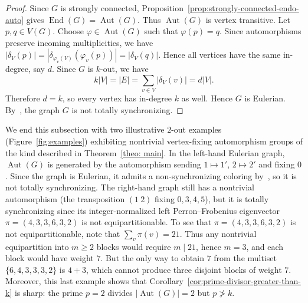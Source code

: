\documentclass[a4paper,10pt]{amsart}
\theoremstyle{plain}
\theoremstyle{definition}
\DeclareMathOperator{\Aut}{Aut}
\DeclareMathOperator{\End}{End}
\begin{document}
\begin{proof}
Since $G$ is strongly connected, Proposition~\ref{prop:strongly-connected-endo-auto} gives $\End(G)=\Aut(G)$. Thus $\Aut(G)$ is vertex transitive. Let $p,q\in V(G)$. Choose $\varphi\in\Aut(G)$ such that $\varphi(p)=q$. Since automorphisms preserve incoming multiplicities, we have
\(
|\delta_V(p)|=|\delta_{\varphi_v(V)}(\varphi_v(p))|=|\delta_V(q)|.
\)
Hence all vertices have the same in-degree, say $d$. Since $G$ is $k$-out, we have 
\[
k|V|=|E|=\sum_{v\in V} |\delta_V(v)|=d|V|.
\]
Therefore $d=k$, so every vertex has in-degree $k$ as well. Hence $G$ is Eulerian. By~\cite[Lemma~1]{Kari2003}, the graph $G$ is not totally synchronizing.
\end{proof}
We end this subsection with two illustrative $2$-out examples (Figure~\ref{fig:examples}) exhibiting nontrivial vertex-fixing automorphism groups of the kind described in Theorem~\ref{theo: main}.
In the left-hand Eulerian graph, $\Aut(G)$ is generated by the automorphism sending $1\mapsto 1'$, $2\mapsto 2'$ and fixing $0$.
Since the graph is Eulerian, it admits a non-synchronizing coloring by~\cite[Lemma~1]{Kari2003}, so it is not totally synchronizing.
The right-hand graph still has a nontrivial automorphism (the transposition $(1\ 2)$ fixing $0,3,4,5$), but it is totally synchronizing since its
integer-normalized left Perron--Frobenius eigenvector $\pi=(4,3,3,6,3,2)$ is not equipartitionable. To see that $\pi=(4,3,3,6,3,2)$ is not equipartitionable, note that $\sum_{v}\pi(v)=21$. Thus any nontrivial equipartition into $m\ge2$ blocks would require $m\mid 21$, hence $m=3$, and each block would have weight $7$. But the only way to obtain $7$ from the multiset $\{6,4,3,3,3,2\}$ is $4+3$, which cannot produce three disjoint blocks of weight $7$.
Moreover, this last example shows that Corollary~\ref{cor:prime-divisor-greater-than-k} is sharp: the prime $p=2$ divides $|\Aut(G)|=2$ but $p\not>k$.
\end{document}
